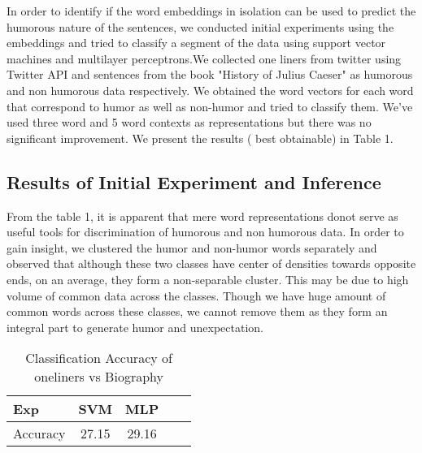 \documentclass{acm_proc_article-sp}
\begin{document}
In order to identify if the word embeddings in isolation can be used to predict the humorous nature of the sentences, we conducted initial experiments using the embeddings and tried to classify a segment of the data using support vector machines and multilayer perceptrons.We collected one liners from twitter using Twitter API and sentences from the book "History of Julius Caeser" as humorous and non humorous data respectively.
We obtained the word vectors for each word that correspond to humor as well as non-humor and tried to classify them. We've used three word and 5 word contexts as representations but there was no significant improvement. We present  the results ( best obtainable) in Table 1.


\subsection{ Results of Initial Experiment and Inference}

From the table 1, it is apparent that mere word representations donot serve as useful tools for discrimination of humorous and non humorous data.
In order to gain insight, we clustered the humor and non-humor words separately and observed that although these two classes have center of densities towards opposite ends, on an average, they form a non-separable cluster. 
This may be due to high volume of common data across the classes. Though we have huge amount of common words across these classes, we cannot remove them as they form an integral part to generate humor and unexpectation.

\begin{table}[h]
\caption{\label{initial}Classification Accuracy of oneliners vs Biography }

\vspace{8pt} %

\centering
\begin{tabular}{|l |c |c| c| c|}
\hline%
Exp &  SVM & MLP   \\
                 
\hline

Accuracy & 27.15 & 29.16  \\
\hline




\end{tabular}
\end{table}
\end{document}
